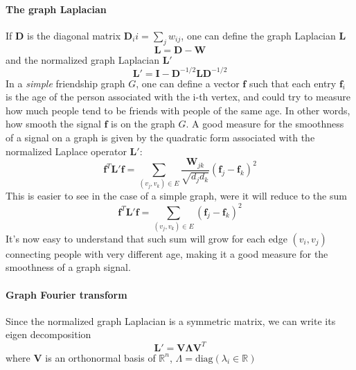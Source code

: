 \paragraph{The graph Laplacian}
If $\mathbf D$ is the diagonal matrix $\mathbf D_ii = \sum_j w_{ij}$, one can define the graph Laplacian $\mathbf L$
\begin{equation}\label{eq:graph Laplacian}
		\mathbf L = \mathbf D-\mathbf W
\end{equation}
 and the normalized graph Laplacian $\mathbf L'$
\begin{equation}\label{eq:normalized graph Laplacian}
\mathbf L' = \mathbf I - \mathbf D^{-1/2}\mathbf L\mathbf D^{-1/2}
\end{equation}
In a \textit{simple} friendship graph $G$, one can define a vector $\mathbf f$ such that each entry $\mathbf f_i$ is the age of the person associated with the i-th vertex, and could try to measure how much people tend to be friends with people of the same age. In other words, how smooth the signal $\mathbf f$ is on the graph $G$. A good measure for the smoothness of a signal on a graph is given by the quadratic form associated with the normalized Laplace operator $\mathbf L'$:
\begin{equation}\label{eq:quadratic form}
	\mathbf f^T \mathbf L' \mathbf f = \sum_{\left(v_{j}, v_{k}\right) \in {E}} \frac{\boldsymbol{W}_{j k}}{\sqrt{d_{j} {d}_{k}}}\left(\boldsymbol{f}_{j}-\boldsymbol{f}_{k}\right)^{2}
\end{equation}
This is easier to see in the case of a simple graph, were it will reduce to the sum 
$$
\mathbf f^T \mathbf L' \mathbf f = \sum_{\left(v_{j}, v_{k}\right) \in {E}} \left(\boldsymbol{f}_{j}-\boldsymbol{f}_{k}\right)^{2}
$$
It's now easy to understand that such sum will grow for each edge $(v_i, v_j)$ connecting people with very different age, making it a good measure for the smoothness of a graph signal.
\paragraph{Graph Fourier transform}
Since the normalized graph Laplacian is a symmetric matrix, we can write its eigen decomposition
$$
\mathbf L' = \mathbf V\mathbf \Lambda\mathbf V^T
$$
 where $\mathbf V$ is an orthonormal basis of $\mathbb R^n$, $\Lambda = \text{diag}(\lambda_i\in \mathbb R)$

